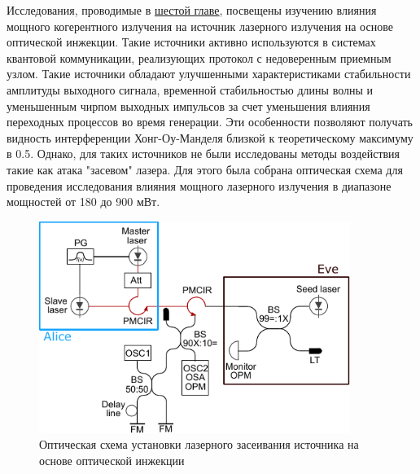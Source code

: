 \newpage Исследования, проводимые в \underline{шестой главе}, посвещены изучению влияния мощного когерентного излучения на источник лазерного излучения на основе оптической инжекции. Такие источники активно используются в системах квантовой коммуникации, реализующих протокол с недоверенным приемным узлом. Такие источники обладают улучшенными характеристиками стабильности амплитуды выходного сигнала, временной стабильностью длины волны и уменьшенным чирпом выходных импульсов за счет уменьшения влияния переходных процессов во время генерации. Эти особенности позволяют получать видность интерференции Хонг-Оу-Манделя близкой к теоретическому максимуму в 0.5. 
\newline Однако, для таких источников не были исследованы методы воздействия такие как атака "засевом" лазера. Для этого была собрана оптическая схема для проведения исследования влияния мощного лазерного излучения в диапазоне мощностей от 180 до 900 мВт. 
\begin{figure}
    \centering
    \includegraphics[width=0.9\textwidth]{images/setup_Faraday_Mirrors_final.pdf}
    \caption{Оптическая схема установки лазерного засеивания источника на основе оптической инжекции}
    \label{fig:enter-label}
\end{figure}


